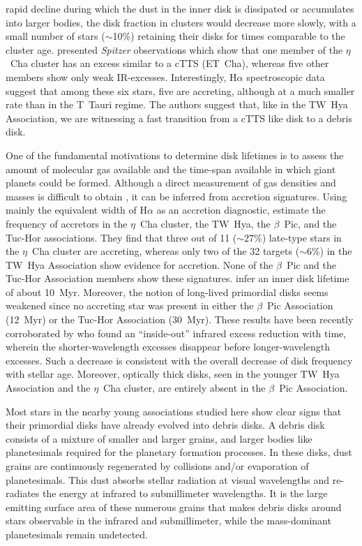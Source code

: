 \documentclass[11pt,twoside]{book}
\begin{document}
rapid decline during which the dust in the inner disk is dissipated or
accumulates into larger bodies, the disk fraction in clusters would
decrease more slowly, with a small number of stars ($ \sim$10\%)
retaining their disks for times comparable to the cluster age.
\cite{Mageath05} presented {\em Spitzer} observations which show that
one member of the $\eta$~Cha cluster has an excess similar to a cTTS
(ET~Cha), whereas five other members show only weak IR-excesses.
Interestingly, H$\alpha$ spectroscopic data suggest that among these
six stars, five are accreting, although at a much smaller rate than in
the T~Tauri regime.  The authors suggest that, like in the TW~Hya
Association, we are witnessing a fast transition from a cTTS like disk
to a debris disk.

One of the fundamental motivations to determine disk lifetimes is to
assess the amount of molecular gas available and the time-span
available in which giant planets could be formed. Although a direct
measurement of gas densities and masses is difficult to obtain
\citep{Richter2002}, it can be inferred from accretion signatures.
Using mainly the equivalent width of H$\alpha$ as an accretion
diagnostic, \cite{Ray06} estimate the frequency of accretors in the
$\eta$~Cha cluster, the TW~Hya, the $\beta$~Pic, and the Tuc-Hor
associations.  They find that three out of 11 ($\sim27$\%) late-type
stars in the $\eta$~Cha cluster are accreting, whereas only two of the
32 targets ($\sim6$\%) in the TW~Hya Association show evidence for
accretion.  None of the $\beta$~Pic and the Tuc-Hor Association
members show these signatures.  \cite{Ray06} infer an inner disk
lifetime of about 10~Myr.  Moreover, the notion of long-lived
primordial disks seems weakened since no accreting star was present in
either the $\beta$~Pic Association (12~Myr) or the Tuc-Hor Association
(30~Myr).  These results have been recently corroborated by
\citet[][see also reference therein]{rebull08} who found an
“inside-out” infrared excess reduction with
time, wherein the shorter-wavelength excesses disappear before
longer-wavelength excesses.  Such a decrease is consistent with the
overall decrease of disk frequency with stellar age.  Moreover,
optically thick disks, seen in the younger TW~Hya Association and the
$\eta$~Cha cluster, are entirely absent in the $\beta$~Pic
Association.


Most stars in the nearby young associations studied here show clear
signs that their primordial disks have already evolved into debris
disks.  A debris disk consists of a mixture of smaller and larger
grains, and larger bodies like planetesimals required for the
planetary formation processes.  In these disks, dust grains are
continuously regenerated by collisions and/or evaporation of
planetesimals.  This dust absorbs stellar radiation at visual
wavelengths and re-radiates the energy at infrared to submillimeter
wavelengths.  It is the large emitting surface area of these numerous
grains that makes debris disks around stars observable in the infrared
and submillimeter, while the mass-dominant planetesimals remain
undetected.
\end{document}
